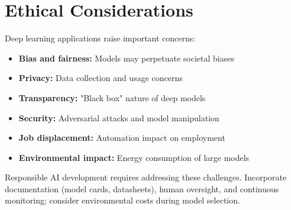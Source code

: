 
\section{Ethical Considerations }
\label{sec:ethics}

Deep learning applications raise important concerns:

\begin{itemize}
    \item \textbf{Bias and fairness:} Models may perpetuate societal biases
    \item \textbf{Privacy:} Data collection and usage concerns
    \item \textbf{Transparency:} "Black box" nature of deep models
    \item \textbf{Security:} Adversarial attacks and model manipulation
    \item \textbf{Job displacement:} Automation impact on employment
    \item \textbf{Environmental impact:} Energy consumption of large models
\end{itemize}

Responsible AI development requires addressing these challenges. Incorporate documentation (model cards, datasheets), human oversight, and continuous monitoring; consider environmental costs during model selection.


